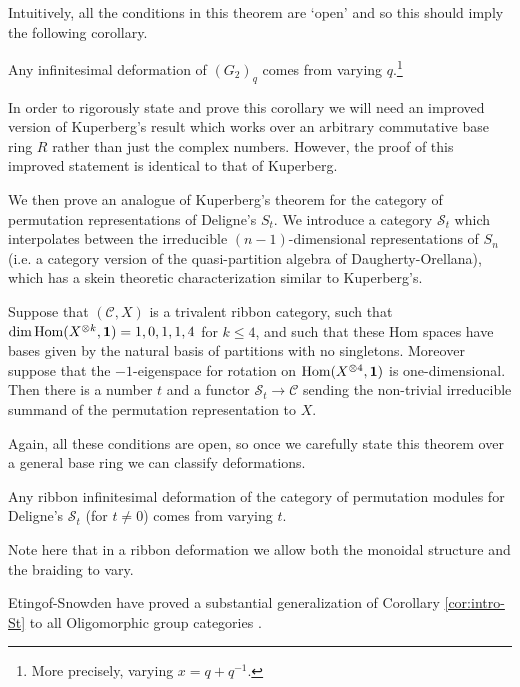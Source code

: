 \documentclass[12pt]{amsart}
\begin{document}
Intuitively, all the conditions in this theorem are `open' and so this should imply the following corollary.

\begin{corollary}\label{cor:intro-G2}
    Any infinitesimal deformation of $(G_2)_q$ comes from varying $q$.\footnote{More precisely, varying $x=q+q^{-1}$.}
\end{corollary}

In order to rigorously state and prove this corollary we will need an improved version of Kuperberg's result which works over an arbitrary commutative base ring $R$ rather than just the complex numbers. However, the proof of this improved statement is identical to that of Kuperberg.

We then prove an analogue of Kuperberg's theorem for the category of permutation representations of Deligne's $S_t$. We introduce a category $\mathcal{S}_t$ which interpolates between the irreducible $(n-1)$-dimensional representations of $S_n$ (i.e. a category version of the quasi-partition algebra \cite{MR3177889} of Daugherty-Orellana), which has a skein theoretic characterization similar to Kuperberg's.

\begin{theorem}
\label{thm:intro-St}
    Suppose that $(\mathcal{C},X)$ is a trivalent ribbon category, such that  $\dim \operatorname{Hom}(X^{\otimes k}, \mathbf{1}) = 1,0,1,1,4$ for $k\leq 4$, and such that these Hom spaces have bases given by the natural basis of partitions with no singletons. Moreover suppose that the $-1$-eigenspace for rotation on $\operatorname{Hom}(X^{\otimes 4},\mathbf{1})$ is one-dimensional. Then there is a number $t$ and a functor $\mathcal{S}_t \rightarrow \mathcal{C}$ sending the non-trivial irreducible summand of the permutation representation to $X$.
\end{theorem}

Again, all these conditions are open, so once we carefully state this theorem over a general base ring we can classify deformations.

\begin{corollary} \label{cor:intro-St}
    Any ribbon infinitesimal deformation of the category of permutation modules for Deligne's $\mathcal{S}_t$ (for $t \neq 0$) comes from varying $t$.
\end{corollary}

Note here that in a ribbon deformation we allow both the monoidal structure and the braiding to vary.

Etingof-Snowden have proved a substantial generalization of Corollary \ref{cor:intro-St} to all Oligomorphic group categories \cite{EtingofSnowdenDeformations}.
\end{document}
